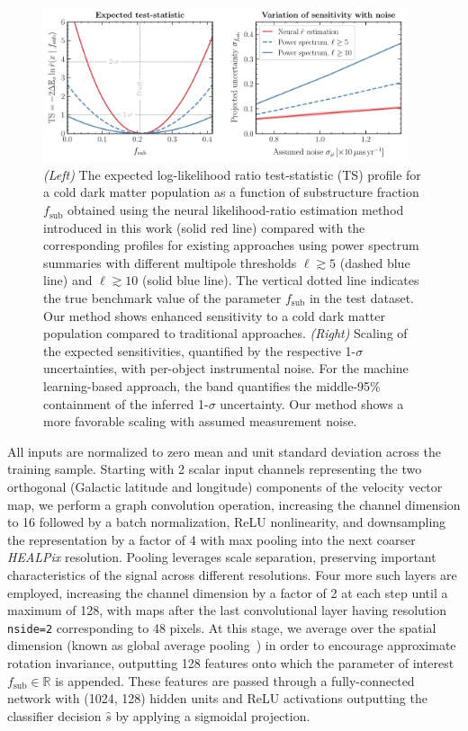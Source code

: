 \documentclass[twocolumn,linenumbers,anonymous]{aastex631}
\newcommand{\package}[1]{\textsl{#1}\xspace}
\newcommand{\healpix}{\package{HEALPix}}
\newcommand{\changes}[1]{{{\color{red}#1}}}
\begin{document}
\begin{figure}[!htbp]
\centering
\includegraphics[width=0.95\textwidth]{results}
\caption{\emph{(Left)} The expected log-likelihood ratio test-statistic (TS) profile for a cold dark matter population as a function of substructure fraction $f_\mathrm{sub}$ obtained using the neural likelihood-ratio estimation method introduced in this work (solid red line) compared with the corresponding profiles for existing approaches using power spectrum summaries with different multipole thresholds $\ell \gtrsim 5$ (dashed blue line) and $\ell \gtrsim 10$ (solid blue line). The vertical dotted line indicates the true benchmark value of the parameter $f_\mathrm{sub}$ in the test dataset. Our method shows enhanced sensitivity to a cold dark matter population compared to traditional approaches. \emph{(Right)} Scaling of the expected sensitivities, quantified by the respective 1-$\sigma$ uncertainties, with per-object instrumental noise. For the machine learning-based approach, the band quantifies the middle-95\% containment of the inferred 1-$\sigma$ uncertainty. Our method shows a more favorable scaling with assumed measurement noise.}
\label{fig:experiment}
\end{figure}

All inputs are normalized to zero mean and unit standard deviation across the training sample. Starting with 2 scalar input channels representing the two orthogonal (Galactic latitude and longitude) components of the velocity vector map, we perform a graph convolution operation, increasing the channel dimension to 16 followed by a batch normalization, ReLU nonlinearity, and downsampling the representation by a factor of 4 with max pooling into the next coarser \healpix resolution. Pooling leverages scale separation, preserving important characteristics of the signal across different resolutions. 
Four more such layers are employed, increasing the channel dimension by a factor of 2 at each step until a maximum of 128, with maps after the last convolutional layer having resolution \texttt{nside=2} corresponding to 48 pixels. At this stage, we average over the spatial dimension (known as global average pooling~\citep{lin2014network}) in order to encourage approximate rotation invariance, outputting 128 features onto which the parameter of interest \changes{$f_\mathrm{sub}\in\mathbb R$} is appended. These features are passed through a fully-connected network with (1024, 128) hidden units and ReLU activations outputting the classifier decision $\hat s$ by applying a sigmoidal projection.
\end{document}
